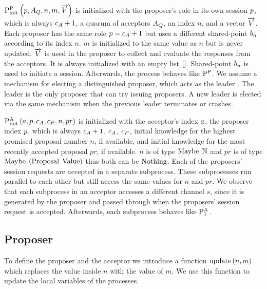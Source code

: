 $\operatorname{P^{P}_{init}}\left(p, A_Q, n, m, \overrightarrow{V}\right)$ is initialized with the proposer's role in its own session $p$, which is always $c_A + 1$, a quorum of acceptors $A_Q$, an index $n$, and a vector $\overrightarrow{V}$.
Each proposer has the same role $p = c_A + 1$ but uses a different shared-point $b_{n}$ according to its index $n$.
$m$ is initialized to the same value as $n$ but is never updated.
$\overrightarrow{V}$ is used in the proposer to collect and evaluate the responses from the acceptors.
It is always initialized with an empty list $\mathtt{[]}$.
Shared-point $b_{n}$ is used to initiate a session.
Afterwards, the process behaves like $\operatorname{P^{P}_{}}$.
We assume a mechanism for electing a distinguished proposer, which acts as the leader \cite{Lamport01}.
The leader is the only proposer that can try issuing proposers.
A new leader is elected via the same mechanism when the previous leader terminates or crashes.

$\operatorname{P^{A}_{init}}\left(a, p, c_A, c_P, n, pr\right)$ is initialized with the acceptor's index $a$, the proposer index $p$, which is always $c_A + 1$, $c_A$, $c_P$, initial knowledge for the highest promised proposal number $n$, if available, and initial knowledge for the most recently accepted proposal $pr$, if available.
$n$ is of type $\operatorname{Maybe}\; \mathbb{N}$ and $pr$ is of type $\operatorname{Maybe}\; \left(\operatorname{Proposal}\; \operatorname{Value}\right)$ thus both can be $\operatorname{Nothing}$.
Each of the proposers' session requests are accepted in a separate subprocess.
These subprocesses run parallel to each other but still access the same values for $n$ and $pr$.
We observe that each subprocess in an acceptor accesses a different channel $s$, since it is generated by the proposer and passed through when the proposers' session request is accepted.
Afterwards, each subprocess behaves like $\operatorname{P^{A}_{1}}$.

\subsection{Proposer}
To define the proposer and the acceptor we introduce a function $\operatorname{update} \left(n, m\right)$ which replaces the value inside $n$ with the value of $m$.
We use this function to update the local variables of the processes.

